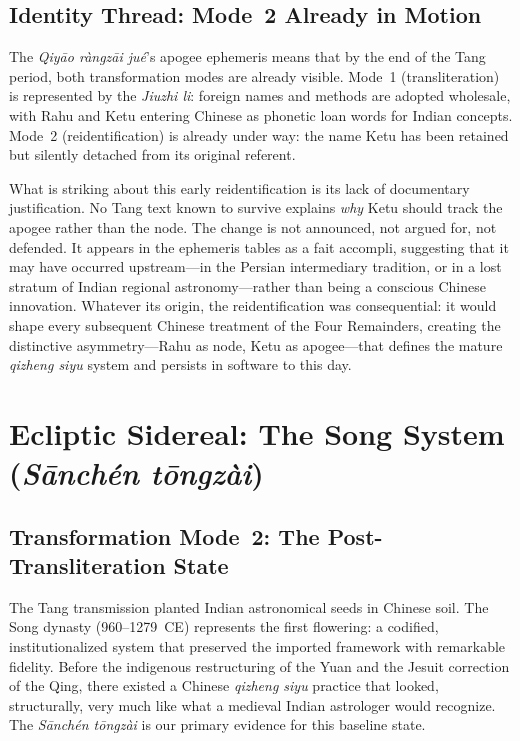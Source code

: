 \documentclass[10pt,a4paper]{article}
\begin{document}
\subsection*{Identity Thread: Mode~2 Already in Motion}

The \textit{Qiy\=ao r\`angz\=ai ju\'e}'s apogee ephemeris means that by
the end of the Tang period, both transformation modes are already
visible.  Mode~1 (transliteration) is represented by the \textit{Jiuzhi
li}: foreign names and methods are adopted wholesale, with Rahu
and Ketu entering Chinese as phonetic loan words for Indian
concepts.  Mode~2 (reidentification) is already under way: the name
Ketu has been retained but silently detached from its original
referent.

What is striking about this early reidentification is its lack of
documentary justification.  No Tang text known to survive explains
\emph{why} Ketu should track the apogee rather than the node.  The
change is not announced, not argued for, not defended.  It appears in
the ephemeris tables as a fait accompli, suggesting that it may have
occurred upstream---in the Persian intermediary tradition, or in a
lost stratum of Indian regional astronomy---rather than being a
conscious Chinese innovation.  Whatever its origin, the reidentification
was consequential: it would shape every subsequent Chinese treatment of
the Four Remainders, creating the distinctive asymmetry---Rahu as node,
Ketu as apogee---that defines the mature \textit{qizheng siyu} system and
persists in software to this day.

\section{Ecliptic Sidereal: The Song System (\textit{S\={a}nch\'{e}n t\={o}ngz\`{a}i})}
\label{sec:song}

\subsection*{Transformation Mode~2: The Post-Transliteration State}

The Tang transmission planted Indian astronomical seeds in Chinese soil.
The Song dynasty (960--1279~CE) represents the first flowering: a codified,
institutionalized system that preserved the imported framework with remarkable
fidelity.  Before the indigenous restructuring of the Yuan and the Jesuit
correction of the Qing, there existed a Chinese \textit{qizheng siyu} practice that
looked, structurally, very much like what a medieval Indian astrologer would
recognize.  The \textit{S\={a}nch\'{e}n t\={o}ngz\`{a}i} is our primary evidence for
this baseline state.
\end{document}

